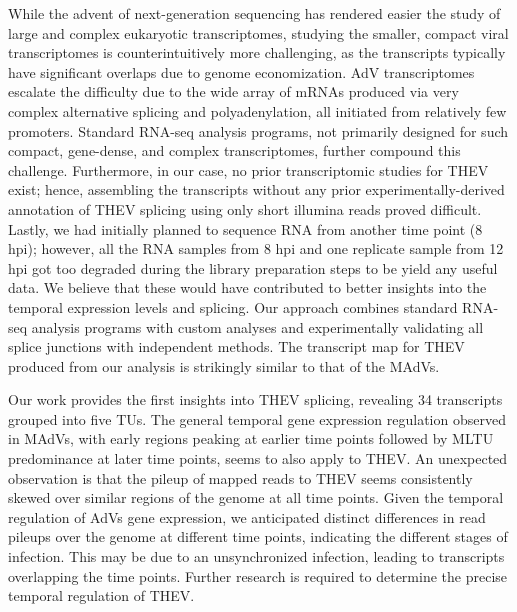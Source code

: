 \documentclass[
]{article}
\begin{document}
While the advent of next-generation sequencing has rendered easier the
study of large and complex eukaryotic transcriptomes, studying the
smaller, compact viral transcriptomes is counterintuitively more
challenging, as the transcripts typically have significant overlaps due
to genome economization. AdV transcriptomes escalate the difficulty due
to the wide array of mRNAs produced via very complex alternative
splicing and polyadenylation, all initiated from relatively few
promoters. Standard RNA-seq analysis programs, not primarily designed
for such compact, gene-dense, and complex transcriptomes, further
compound this challenge. Furthermore, in our case, no prior
transcriptomic studies for THEV exist; hence, assembling the transcripts
without any prior experimentally-derived annotation of THEV splicing
using only short illumina reads proved difficult. Lastly, we had
initially planned to sequence RNA from another time point (8 hpi);
however, all the RNA samples from 8 hpi and one replicate sample from 12
hpi got too degraded during the library preparation steps to be yield
any useful data. We believe that these would have contributed to better
insights into the temporal expression levels and splicing. Our approach
combines standard RNA-seq analysis programs with custom analyses and
experimentally validating all splice junctions with independent methods.
The transcript map for THEV produced from our analysis is strikingly
similar to that of the MAdVs.

Our work provides the first insights into THEV splicing, revealing 34
transcripts grouped into five TUs. The general temporal gene expression
regulation observed in MAdVs, with early regions peaking at earlier time
points followed by MLTU predominance at later time points, seems to also
apply to THEV. An unexpected observation is that the pileup of mapped
reads to THEV seems consistently skewed over similar regions of the
genome at all time points. Given the temporal regulation of AdVs gene
expression, we anticipated distinct differences in read pileups over the
genome at different time points, indicating the different stages of
infection. This may be due to an unsynchronized infection, leading to
transcripts overlapping the time points. Further research is required to
determine the precise temporal regulation of THEV.
\end{document}
